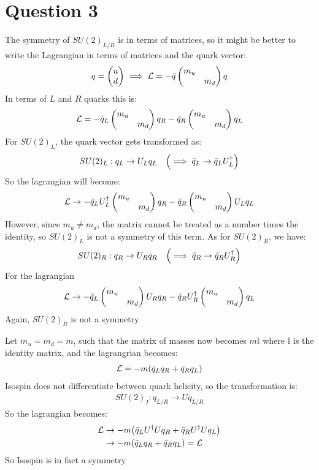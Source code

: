\documentclass[12pt]{article}
\begin{document}
\section*{Question 3}
The symmetry of $SU(2)_{L/R}$ is in terms of matrices, so it might be better to write the Lagrangian in terms of matrices and the quark vector:
\begin{align*}
  q=\pmqty{u\\d}\implies \mathcal{L}=-\bar{q}\pmqty{m_u&\\&m_d}q
\end{align*}
In terms of $L$ and $R$ quarks this is:
\begin{align*}
  \mathcal{L}=-\bar{q}_L\pmqty{m_u&\\&m_d}q_R-\bar{q}_R\pmqty{m_u&\\&m_d}q_L
\end{align*}
For $SU(2)_L$, the quark vector gets transformed as:
\begin{align*}
  SU(2)_L:q_L\to U_Lq_L\quad\qty(\implies\bar{q}_L\to\bar{q}_LU^\dag_L)
\end{align*}
So the lagrangian will become:
\begin{align*}
  \mathcal{L}\to-\bar{q}_LU^\dag_L\pmqty{m_u&\\&m_d}q_R
  -\bar{q}_R\pmqty{m_u&\\&m_d}U_Lq_L
\end{align*}
However, since $m_u\neq m_d$, the matrix cannot be treated as a number times the identity, so $SU(2)_L$ is not a symmetry of this term. As for $SU(2)_R$, we have:
\begin{align*}
  SU(2)_R:q_R\to U_Rq_R\quad\qty(\implies\bar{q}_R\to\bar{q}_RU^\dag_R)
\end{align*}
For the lagrangian
\begin{align*}
  \mathcal{L}\to-\bar{q}_L\pmqty{m_u&\\&m_d}U_Rq_R
  -\bar{q}_RU^\dag_R\pmqty{m_u&\\&m_d}q_L
\end{align*}
Again, $SU(2)_R$ is not a symmetry

Let $m_u=m_d=m$, such that the matrix of masses now becomes $m\mathbb{I}$ where $\mathbb{I}$ is the identity matrix, and the lagrangrian becomes:
\begin{align*}
  \mathcal{L}=-m\qty(\bar{q}_Lq_R+\bar{q}_Rq_L)
\end{align*}
Isospin does not differentiate between quark helicity, so the transformation is:
\begin{align*}
  SU(2)_I:q_{L/R}\to Uq_{L/R}
\end{align*}
So the lagrangian becomes:
\begin{align*}
  \mathcal{L}&\to-m\qty(\bar{q}_LU^\dag Uq_R+\bar{q}_RU^\dag Uq_L)\\
  &\to-m\qty(\bar{q}_Lq_R+\bar{q}_Rq_L)=\mathcal{L}
\end{align*}
So Isospin is in fact a symmetry
\end{document}
